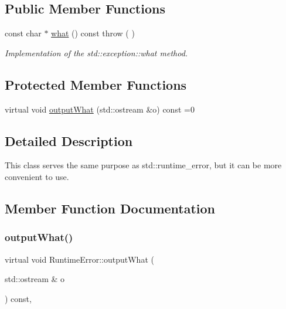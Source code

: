 \subsection*{Public Member Functions}
\begin{DoxyCompactItemize}
\item 
\mbox{\label{class_runtime_error_a7f870aa3e981b604d68555bbfbb7b13e}} 
const char $\ast$ \hyperlink{class_runtime_error_a7f870aa3e981b604d68555bbfbb7b13e}{what} () const  throw ( )
\begin{DoxyCompactList}\small\item\em Implementation of the std\+::exception\+::what method. \end{DoxyCompactList}\end{DoxyCompactItemize}
\subsection*{Protected Member Functions}
\begin{DoxyCompactItemize}
\item 
virtual void \hyperlink{class_runtime_error_a5020b04a2a7fac8b1dbfbfe4a30055b0}{output\+What} (std\+::ostream \&o) const =0
\end{DoxyCompactItemize}


\subsection{Detailed Description}
This class serves the same purpose as std\+::runtime\+\_\+error, but it can be more convenient to use. 

\subsection{Member Function Documentation}
\mbox{\label{class_runtime_error_a5020b04a2a7fac8b1dbfbfe4a30055b0}} 
\subsubsection{\texorpdfstring{output\+What()}{outputWhat()}}
{\footnotesize\ttfamily virtual void Runtime\+Error\+::output\+What (\begin{DoxyParamCaption}\item[{std\+::ostream \&}]{o }\end{DoxyParamCaption}) const\hspace{0.3cm}{\ttfamily [protected]}, {}}

